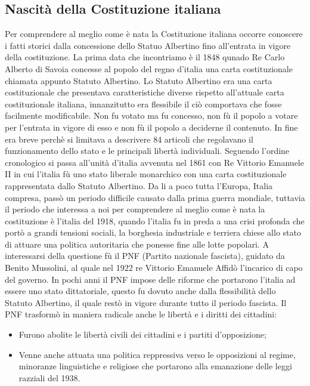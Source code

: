\documentclass{report}
\begin{document}
\subsection{Nascità della Costituzione italiana}
Per comprendere al meglio come è nata la Costituzione italiana occorre conoscere i fatti storici dalla concessione dello Statuo Albertino fino all'entrata in vigore della costituzione.
La prima data che incontriamo è il 1848 qunado Re Carlo Alberto di Savoia concesse al popolo del regno d'italia una carta costituzionale chiamata appunto Statuto Albertino.
Lo Statuto Albertino era una carta costituzionale che presentava caratteristiche diverse rispetto all'attuale carta costituzionale italiana, innanzitutto era flessibile il ciò comportava che fosse facilmente modificabile.
Non fu votato ma fu concesso, non fù il popolo a votare per l'entrata in vigore di esso e non fù il popolo a deciderne il contenuto. 
In fine era breve perchè si limitava a descrivere 84 articoli che regolavano il funzionamento dello stato e le principali libertà individuali.
Seguendo l'ordine cronologico si passa all'unità d'italia avvenuta nel 1861 con Re Vittorio Emanuele II in cui l'italia fù uno stato liberale monarchico con una carta costituzionale rappresentata dallo Statuto Albertino.
Da li a poco tutta l'Europa, Italia compresa, passò un periodo difficile causato dalla prima guerra mondiale, tuttavia il periodo che interessa a noi per comprendere al meglio come è nata la costituzione è l'italia del 1918, quando l'italia fu in preda a una crisi profonda che portò a grandi tensioni sociali, la borghesia industriale e terriera chiese allo stato di attuare una politica autoritaria che ponesse fine alle lotte popolari.
A interessarsi della questione fù il PNF (Partito nazionale fascista), guidato da Benito Mussolini, al quale nel 1922 re Vittorio Emanuele Affidò l'incarico di capo del governo. 
In pochi anni il PNF impose delle riforme che portarono l'italia ad essere uno stato dittatoriale, questo fu dovuto anche dalla flessibilità dello Statuto Albertino, il quale restò in vigore durante tutto il periodo fascista.
Il PNF trasformò in maniera radicale anche le libertà e i diritti dei cittadini:
\begin{itemize}
  \item Furono abolite le libertà civili dei cittadini e i partiti d'opposizione;
  \item Venne anche attuata una politica reppressiva verso le opposizioni al regime, minoranze linguistiche e religiose che portarono alla emanazione delle leggi razziali del 1938.
\end{itemize}
\end{document}
